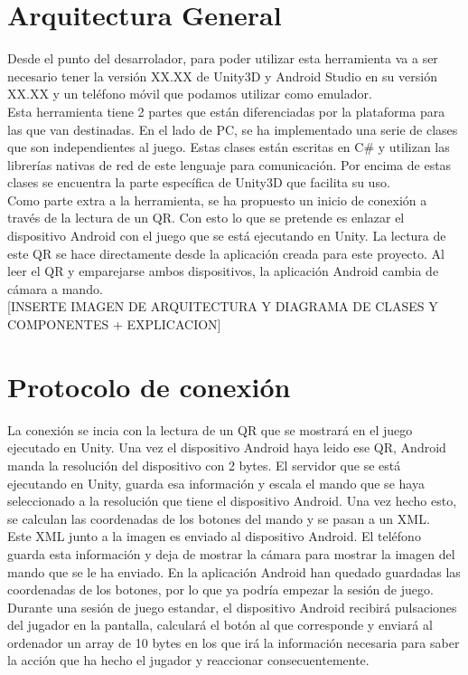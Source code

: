 \section{Arquitectura General}
\label{cap4:sec:arquitectura_general}
Desde el punto del desarrolador, para poder utilizar esta herramienta va a ser necesario tener la versi\'on XX.XX de Unity3D y Android Studio en su versi\'on XX.XX y un tel\'efono m\'ovil que podamos utilizar como emulador.
\\
Esta herramienta tiene 2 partes que est\'an diferenciadas por la plataforma para las que van destinadas. En el lado de PC, se ha implementado una serie de clases que son independientes al juego. 
Estas clases est\'an escritas en C\# y utilizan las librer\'ias  nativas de red de este lenguaje para comunicaci\'on. Por encima de estas clases se encuentra la parte espec\'ifica de Unity3D que facilita su uso. 
\\
Como parte extra a la herramienta, se ha propuesto un inicio de conexi\'on a trav\'es de la lectura de un QR. Con esto lo que se pretende es enlazar el dispositivo Android con el juego que se est\'a ejecutando en Unity. 
La lectura de este QR se hace directamente desde la aplicaci\'on creada para este proyecto. Al leer el QR y emparejarse ambos dispositivos, la aplicaci\'on Android cambia de c\'amara a mando.
\\

[INSERTE IMAGEN DE ARQUITECTURA Y DIAGRAMA DE CLASES Y COMPONENTES  + EXPLICACION]


\section{Protocolo de conexi\'on}
\label{cap4:sec:protocolo}

La conexi\'on se incia con la lectura de un QR que se mostrar\'a en el juego ejecutado en Unity. Una vez el dispositivo Android haya leido ese QR, Android manda la resoluci\'on del dispositivo con 2 bytes. 
El servidor que se est\'a ejecutando en Unity, guarda esa informaci\'on y escala el mando que se haya seleccionado a la resoluci\'on que tiene el dispositivo Android. Una vez hecho esto, se calculan las coordenadas de los botones del mando y se pasan a un XML.
\\
Este XML junto a la imagen es enviado al dispositivo Android. El tel\'efono guarda esta informaci\'on y deja de mostrar la c\'amara para mostrar la imagen del mando que se le ha enviado. En la aplicaci\'on Android han quedado guardadas las coordenadas de los botones, por lo que ya podr\'ia empezar la sesi\'on de juego.
\\
Durante una sesi\'on de juego estandar, el dispositivo Android recibir\'a pulsaciones del jugador en la pantalla, calcular\'a el bot\'on al que corresponde y enviar\'a al ordenador un array de 10 bytes en los que ir\'a la informaci\'on necesaria para saber la acci\'on que ha hecho el jugador y reaccionar consecuentemente.
\\

